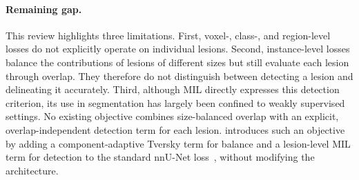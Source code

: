 \paragraph{Remaining gap.}
This review highlights three limitations. First, voxel-, class-, and
region-level losses do not explicitly operate on individual lesions.
Second, instance-level losses balance the contributions of lesions of
different sizes but still evaluate each lesion through overlap. They
therefore do not distinguish between detecting a lesion and delineating it
accurately. Third, although MIL directly expresses this detection
criterion, its use in segmentation has largely been confined to weakly
supervised settings. No existing objective combines size-balanced overlap
with an explicit, overlap-independent detection term for each lesion.
 introduces such an objective by adding a
component-adaptive Tversky term for balance and a lesion-level MIL term for
detection to the standard nnU-Net loss~\cite{isensee_nnu-net_2021},
without modifying the architecture.
